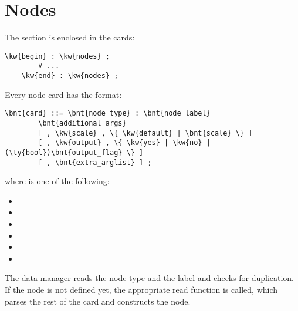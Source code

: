 %
%
%
%
%
% 
%
%

\chapter{Nodes}\label{sec:NODES}
The  section is enclosed in the cards:
\begin{Verbatim}[commandchars=\\\{\}]
    \kw{begin} : \kw{nodes} ;
        # ...
    \kw{end} : \kw{nodes} ;
\end{Verbatim}
Every node card has the format:
\begin{Verbatim}[commandchars=\\\{\}]
    \bnt{card} ::= \bnt{node_type} : \bnt{node_label}
        \bnt{additional_args}
        [ , \kw{scale} , \{ \kw{default} | \bnt{scale} \} ]
        [ , \kw{output} , \{ \kw{yes} | \kw{no} | (\ty{bool})\bnt{output_flag} \} ]
        [ , \bnt{extra_arglist} ] ;
\end{Verbatim}
where  is one of the following:
\begin{itemize}
    \item {}
    \item {}
    \item {}
    \item {}
    \item {}
    \item {}
\end{itemize}
The data manager reads the node type and the label and checks for
duplication.
If the node is not defined yet, the appropriate read function is
called, which parses the rest of the card and constructs the node.

